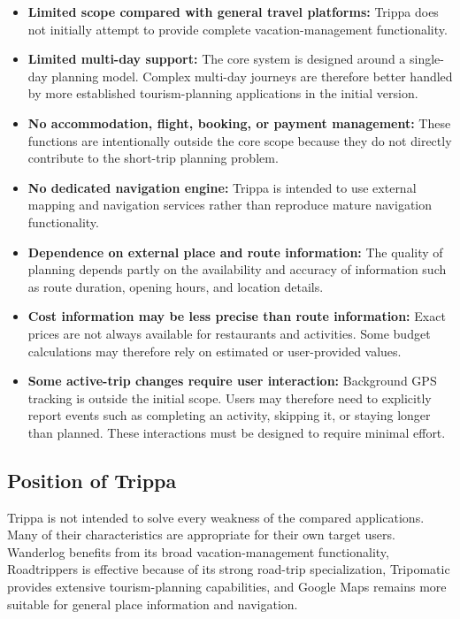 \begin{itemize}
\item \textbf{Limited scope compared with general travel platforms:} Trippa does not initially attempt to provide complete vacation-management functionality.
\item \textbf{Limited multi-day support:} The core system is designed around a single-day planning model. Complex multi-day journeys are therefore better handled by more established tourism-planning applications in the initial version.
\item \textbf{No accommodation, flight, booking, or payment management:} These functions are intentionally outside the core scope because they do not directly contribute to the short-trip planning problem. \sourcetbd{}
\item \textbf{No dedicated navigation engine:} Trippa is intended to use external mapping and navigation services rather than reproduce mature navigation functionality.
\item \textbf{Dependence on external place and route information:} The quality of planning depends partly on the availability and accuracy of information such as route duration, opening hours, and location details.
\item \textbf{Cost information may be less precise than route information:} Exact prices are not always available for restaurants and activities. Some budget calculations may therefore rely on estimated or user-provided values.
\item \textbf{Some active-trip changes require user interaction:} Background GPS tracking is outside the initial scope. Users may therefore need to explicitly report events such as completing an activity, skipping it, or staying longer than planned. These interactions must be designed to require minimal effort. \sourcetbd{}
\end{itemize}


\subsection{Position of Trippa}

Trippa is not intended to solve every weakness of the compared applications. Many of their characteristics are appropriate for their own target users. Wanderlog benefits from its broad vacation-management functionality, Roadtrippers is effective because of its strong road-trip specialization, Tripomatic provides extensive tourism-planning capabilities, and Google Maps remains more suitable for general place information and navigation.


